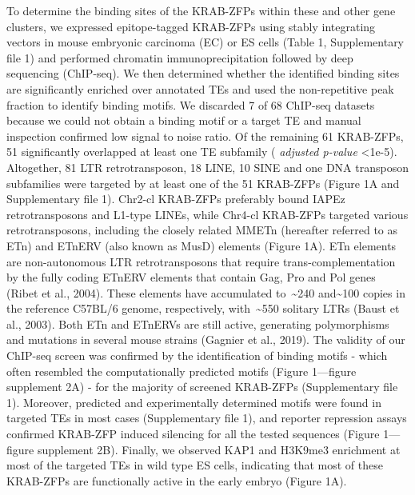 \documentclass[11pt,a4paper]{article}
\begin{document}
To determine the binding sites of the KRAB-ZFPs within these and other gene clusters, we expressed epitope-tagged KRAB-ZFPs using stably integrating vectors in mouse embryonic carcinoma (EC) or ES cells (Table 1, Supplementary file 1) and performed chromatin immunoprecipitation followed by deep sequencing (ChIP-seq). We then determined whether the identified binding sites are significantly enriched over annotated TEs and used the non-repetitive peak fraction to identify binding motifs. We discarded 7 of 68 ChIP-seq datasets because we could not obtain a binding motif or a target TE and manual inspection confirmed low signal to noise ratio. Of the remaining 61 KRAB-ZFPs, 51 significantly overlapped at least one TE subfamily ( \textit{adjusted p-value} <1e-5). Altogether, 81 LTR retrotransposon, 18 LINE, 10 SINE and one DNA transposon subfamilies were targeted by at least one of the 51 KRAB-ZFPs (Figure 1A and Supplementary file 1). Chr2-cl KRAB-ZFPs preferably bound IAPEz retrotransposons and L1-type LINEs, while Chr4-cl KRAB-ZFPs targeted various retrotransposons, including the closely related MMETn (hereafter referred to as ETn) and ETnERV (also known as MusD) elements (Figure 1A). ETn elements are non-autonomous LTR retrotransposons that require trans-complementation by the fully coding ETnERV elements that contain Gag, Pro and Pol genes (Ribet et al., 2004). These elements have accumulated to \textasciitilde{}240 and\textasciitilde{}100 copies in the reference C57BL/6 genome, respectively, with \textasciitilde{}550 solitary LTRs (Baust et al., 2003). Both ETn and ETnERVs are still active, generating polymorphisms and mutations in several mouse strains (Gagnier et al., 2019). The validity of our ChIP-seq screen was confirmed by the identification of binding motifs - which often resembled the computationally predicted motifs (Figure 1—figure supplement 2A) - for the majority of screened KRAB-ZFPs (Supplementary file 1). Moreover, predicted and experimentally determined motifs were found in targeted TEs in most cases (Supplementary file 1), and reporter repression assays confirmed KRAB-ZFP induced silencing for all the tested sequences (Figure 1—figure supplement 2B). Finally, we observed KAP1 and H3K9me3 enrichment at most of the targeted TEs in wild type ES cells, indicating that most of these KRAB-ZFPs are functionally active in the early embryo (Figure 1A).
\end{document}
